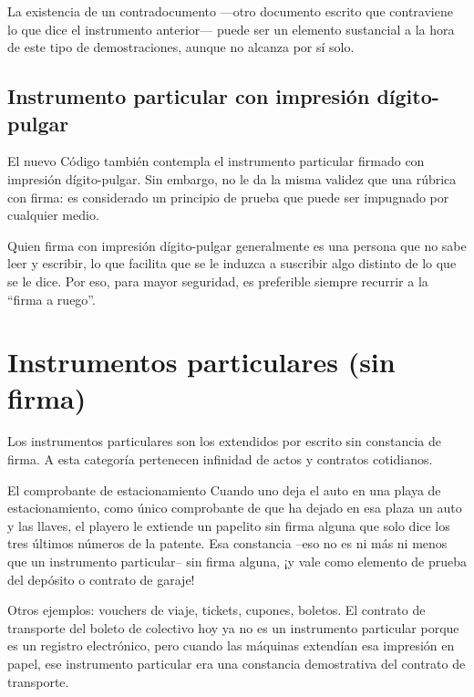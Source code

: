 \documentclass[12pt,oneside]{book}
\begin{document}
La existencia de un contradocumento —otro documento escrito que contraviene lo que dice el instrumento anterior— puede ser un elemento sustancial a la hora de este tipo de demostraciones, aunque no alcanza por sí solo.

\subsection{Instrumento particular con impresión dígito-pulgar}

El nuevo Código también contempla el instrumento particular firmado con impresión dígito-pulgar. Sin embargo, no le da la misma validez que una rúbrica con firma: es considerado un principio de prueba que puede ser impugnado por cualquier medio.

\begin{note}
Quien firma con impresión dígito-pulgar generalmente es una persona que no sabe leer y escribir, lo que facilita que se le induzca a suscribir algo distinto de lo que se le dice. Por eso, para mayor seguridad, es preferible siempre recurrir a la ``firma a ruego''.
\end{note}

\section{Instrumentos particulares (sin firma)}

Los instrumentos particulares son los extendidos por escrito sin constancia de firma. A esta categoría pertenecen infinidad de actos y contratos cotidianos.

\begin{example}{El comprobante de estacionamiento}
Cuando uno deja el auto en una playa de estacionamiento, como único comprobante de que ha dejado en esa plaza un auto y las llaves, el playero le extiende un papelito sin firma alguna que solo dice los tres últimos números de la patente. Esa constancia --eso no es ni más ni menos que un instrumento particular-- sin firma alguna, ¡y vale como elemento de prueba del depósito o contrato de garaje!
\end{example}

Otros ejemplos: vouchers de viaje, tickets, cupones, boletos. El contrato de transporte del boleto de colectivo hoy ya no es un instrumento particular porque es un registro electrónico, pero cuando las máquinas extendían esa impresión en papel, ese instrumento particular era una constancia demostrativa del contrato de transporte.
\end{document}
